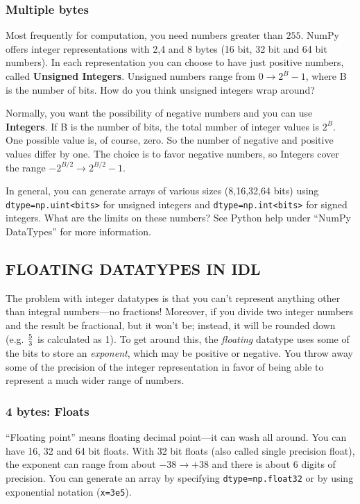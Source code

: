 \documentclass[psfig,preprint]{aastex}
\begin{document}
\subsubsection{Multiple bytes}

        Most frequently for computation, you need numbers greater than $255$. NumPy 
offers integer representations with 2,4 and 8 bytes (16 bit, 32 bit and 64 bit numbers).
In each representation you can choose to have just positive numbers, called 
{\bf Unsigned Integers}. Unsigned numbers range from $0 \rightarrow 2^{B} -1$, where B 
is the number of bits. How do you think unsigned integers wrap around?

	Normally, you want the possibility of negative numbers and you can use 
{\bf Integers}. If B is the number of bits, the total number of integer values is $2^{B}$. 
One possible value is, of course, zero.  So the number of negative and positive values 
differ by one.  The choice is to favor negative numbers, so Integers cover the range 
$-2^{B/2} \rightarrow 2^{B/2}-1$. 

	In general, you can generate arrays of various sizes (8,16,32,64 bits) using 
{\tt dtype=np.uint<bits>} for unsigned integers and {\tt dtype=np.int<bits>} for 
signed integers. What are the limits on these numbers? See Python help 
under ``NumPy DataTypes'' for more information.  

\subsection {FLOATING DATATYPES IN IDL} \label{floats}

	The problem with integer datatypes is that you can't represent
anything other than integral numbers---no fractions! Moreover, if you
divide two integer numbers and the result be fractional, but it
won't be; instead, it will be rounded down (e.g.  $5 \over 3$ is
calculated as 1).  To get around this, the {\it floating} datatype uses
some of the bits to store an {\it exponent}, which may be positive or
negative.  You throw away some of the precision of the integer
representation in favor of being able to represent a much wider range of
numbers. 

\subsubsection{4 bytes: Floats}

	``Floating point'' means floating decimal point---it can wash all
around.  You can have 16, 32 and 64 bit floats. With 32 bit floats (also 
called single precision float), the exponent can range from about 
$-38 \rightarrow+38$ and there is about 6 digits of precision.  You can 
generate an array by specifying {\tt dtype=np.float32} or by using 
exponential notation ({\tt x=3e5}).
\end{document}
